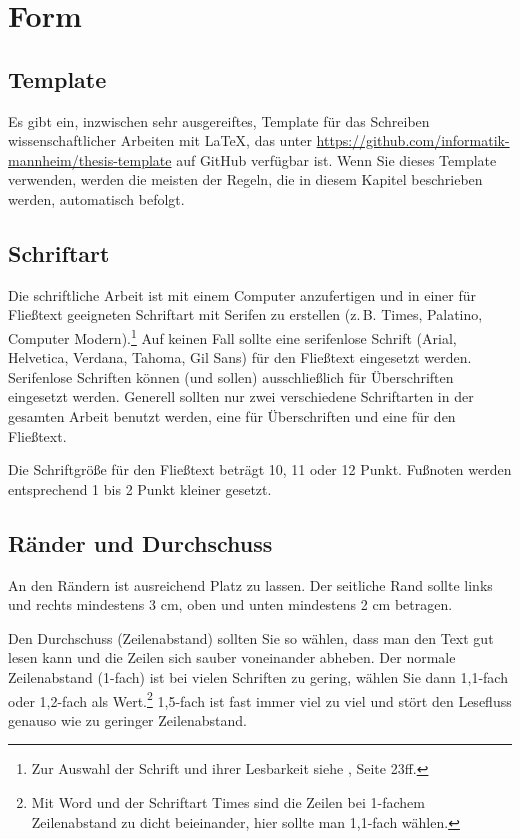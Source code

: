 \documentclass[a4paper,11pt,headings=normal]{scrartcl}
\begin{document}
\section{Form}

\subsection{Template}
Es gibt ein, inzwischen sehr ausgereiftes, Template für das Schreiben wissenschaftlicher Arbeiten mit \LaTeX, das unter \url{https://github.com/informatik-mannheim/thesis-template} auf GitHub verfügbar ist. Wenn Sie dieses Template verwenden, werden die meisten der Regeln, die in diesem Kapitel beschrieben werden, automatisch befolgt.

\subsection{Schriftart}
Die schriftliche Arbeit ist mit einem Computer anzufertigen und in einer für Fließtext geeigneten Schriftart mit Serifen zu erstellen (z.\,B. Times, Palatino, Computer Modern).\footnote{Zur Auswahl der Schrift und ihrer Lesbarkeit siehe \autocite{Willberg1999}, Seite 23ff.} Auf keinen Fall sollte eine serifenlose Schrift (Arial, Helvetica, Verdana, Tahoma, Gil Sans) für den Fließtext eingesetzt werden. Serifenlose Schriften können (und sollen) ausschließlich für Überschriften eingesetzt werden. Generell sollten nur zwei verschiedene Schriftarten in der gesamten Arbeit benutzt werden, eine für Überschriften und eine für den Fließtext.

Die Schriftgröße für den Fließtext beträgt 10, 11 oder 12 Punkt. Fußnoten werden entsprechend 1 bis 2 Punkt kleiner gesetzt.

\subsection{Ränder und Durchschuss}
An den Rändern  ist ausreichend Platz zu lassen. Der seitliche Rand sollte links und rechts mindestens 3 cm, oben und unten mindestens 2 cm betragen.

Den Durchschuss (Zeilenabstand) sollten Sie so wählen, dass man den Text gut lesen kann und die Zeilen sich sauber voneinander abheben. Der normale Zeilenabstand (1-fach) ist bei vielen Schriften zu gering, wählen Sie dann 1,1-fach oder 1,2-fach als Wert.\footnote{Mit Word und der Schriftart Times sind die Zeilen bei 1-fachem Zeilenabstand zu dicht beieinander, hier sollte man 1,1-fach wählen.} 1,5-fach ist fast immer viel zu viel und stört den Lesefluss genauso wie zu geringer Zeilenabstand.
\end{document}
